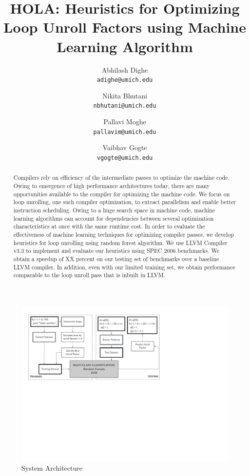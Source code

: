 \documentclass[]{sig-alternate}
\author{
  Abhilash Dighe\\
  \texttt{adighe@umich.edu} 
  \and
  Nikita Bhutani\\
  \texttt{nbhutani@umich.edu}
  \and
  Pallavi Moghe\\
  \texttt{pallavim@umich.edu} 
  \and
  Vaibhav Gogte\\
  \texttt{vgogte@umich.edu}
}
\title{HOLA: Heuristics for Optimizing Loop Unroll Factors using Machine Learning Algorithm\\\vspace{-4mm}}
\begin{document}
\makeatletter
\def\@copyrightspace{\relax}
\makeatother

\maketitle




\begin{abstract}
Compilers rely on efficiency of the intermediate passes to optimize the machine code. Owing to emergence of high performance architectures today, there are many opportunities available to the compiler for optimizing the machine code. We focus on loop unrolling, one such compiler optimization, to extract parallelism and enable better instruction scheduling. Owing to a huge search space in machine code, machine learning algorithms can account for dependencies between several optimization characteristics at once with the same runtime cost. In order to evaluate the effectiveness of machine learning techniques for optimizing compiler passes, we develop heuristics for loop unrolling using random forest algorithm.  We use LLVM Compiler v3.3 to implement and evaluate our heuristics using SPEC 2006 benchmarks. We obtain a speedup of XX percent on our testing set of benchmarks over a baseline LLVM compiler. In addition, even with our limited training set, we obtain performance comparable to the loop unroll pass that is inbuilt in LLVM.
\end{abstract}

\begin{figure}
  \center
  \includegraphics[width=0.90\linewidth]{fig/systemArchitecture.pdf}
  \caption{System Architecture}
  \label{fig:systemArchitechture}
\end{figure}
\end{document}
